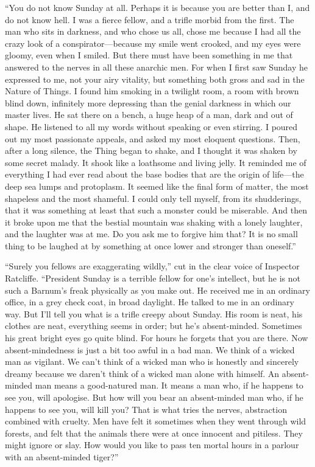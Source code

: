\documentclass{book}
\begin{document}
“You do not know Sunday at all. Perhaps it is because you are better than I, and do not know hell. I was a fierce fellow, and a trifle morbid from the first. The man who sits in darkness, and who chose us all, chose me because I had all the crazy look of a conspirator—because my smile went crooked, and my eyes were gloomy, even when I smiled. But there must have been something in me that answered to the nerves in all these anarchic men. For when I first saw Sunday he expressed to me, not your airy vitality, but something both gross and sad in the Nature of Things. I found him smoking in a twilight room, a room with brown blind down, infinitely more depressing than the genial darkness in which our master lives. He sat there on a bench, a huge heap of a man, dark and out of shape. He listened to all my words without speaking or even stirring. I poured out my most passionate appeals, and asked my most eloquent questions. Then, after a long silence, the Thing began to shake, and I thought it was shaken by some secret malady. It shook like a loathsome and living jelly. It reminded me of everything I had ever read about the base bodies that are the origin of life—the deep sea lumps and protoplasm. It seemed like the final form of matter, the most shapeless and the most shameful. I could only tell myself, from its shudderings, that it was something at least that such a monster could be miserable. And then it broke upon me that the bestial mountain was shaking with a lonely laughter, and the laughter was at me. Do you ask me to forgive him that? It is no small thing to be laughed at by something at once lower and stronger than oneself.”

“Surely you fellows are exaggerating wildly,” cut in the clear voice of Inspector Ratcliffe. “President Sunday is a terrible fellow for one’s intellect, but he is not such a Barnum’s freak physically as you make out. He received me in an ordinary office, in a grey check coat, in broad daylight. He talked to me in an ordinary way. But I’ll tell you what is a trifle creepy about Sunday. His room is neat, his clothes are neat, everything seems in order; but he’s absent-minded. Sometimes his great bright eyes go quite blind. For hours he forgets that you are there. Now absent-mindedness is just a bit too awful in a bad man. We think of a wicked man as vigilant. We can’t think of a wicked man who is honestly and sincerely dreamy because we daren’t think of a wicked man alone with himself. An absent-minded man means a good-natured man. It means a man who, if he happens to see you, will apologise. But how will you bear an absent-minded man who, if he happens to see you, will kill you? That is what tries the nerves, abstraction combined with cruelty. Men have felt it sometimes when they went through wild forests, and felt that the animals there were at once innocent and pitiless. They might ignore or slay. How would you like to pass ten mortal hours in a parlour with an absent-minded tiger?”
\end{document}
